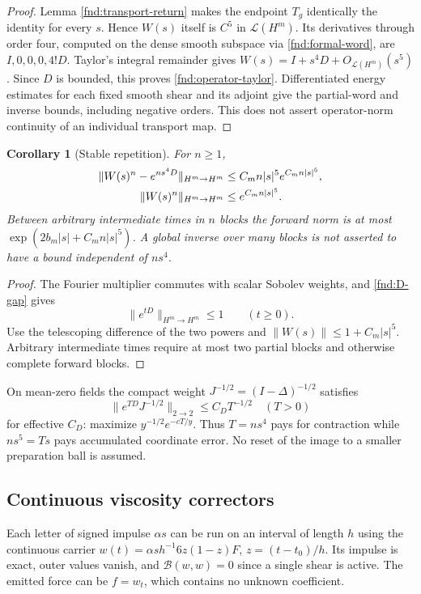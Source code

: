 \documentclass[11pt,a4paper]{amsart}
\newtheorem{corollary}[theorem]{Corollary}
\theoremstyle{definition}
\theoremstyle{remark}
\numberwithin{equation}{section}
\newcommand{\Bcal}{\mathcal B}
\begin{document}
\begin{proof}
Lemma \ref{fnd:transport-return} makes the endpoint $T_g$ identically the
identity for every $s$. Hence $W(s)$ itself is $C^5$ in $\mathcal L(H^m)$.
Its derivatives through order four, computed on the dense smooth subspace via
\eqref{fnd:formal-word}, are $I,0,0,0,4!D$. Taylor's integral remainder gives
$W(s)=I+s^4D+O_{\mathcal L(H^m)}(s^5)$. Since $D$ is bounded, this proves
\eqref{fnd:operator-taylor}. Differentiated energy estimates for each fixed
smooth shear and its adjoint give the partial-word and inverse bounds,
including negative orders. This does not assert operator-norm continuity of
an individual transport map.
\end{proof}

\begin{corollary}[Stable repetition]\label{fnd:repetition}
For $n\ge1$,
\begin{align}
 \|W(s)^n-e^{ns^4D}\|_{H^m\to H^m}
 &\le C_m n|s|^5e^{C_m n|s|^5},\label{fnd:repeat-error}\\
 \|W(s)^n\|_{H^m\to H^m}&\le e^{C_m n|s|^5}.\notag
\end{align}
Between arbitrary intermediate times in $n$ blocks the forward norm is at most
$\exp(2b_m|s|+C_mn|s|^5)$. A global inverse over many blocks is not asserted to
have a bound independent of $ns^4$.
\end{corollary}
\begin{proof}
The Fourier multiplier commutes with scalar Sobolev weights, and
\eqref{fnd:D-gap} gives
\[\|e^{tD}\|_{H^m\to H^m}\le1\qquad(t\ge0).\]
Use the telescoping difference of the two powers and
$\|W(s)\|\le1+C_m|s|^5$. Arbitrary intermediate times require at most two
partial blocks and otherwise complete forward blocks.
\end{proof}

On mean-zero fields the compact weight $J^{-1/2}=(I-\Delta)^{-1/2}$ satisfies
\begin{equation}
 \|e^{TD}J^{-1/2}\|_{2\to2}\le C_DT^{-1/2}\quad(T>0)
 \label{fnd:weighted-decay}
\end{equation}
for effective $C_D$: maximize $y^{-1/2}e^{-cT/y}$. Thus $T=ns^4$ pays for
contraction while $ns^5=Ts$ pays accumulated coordinate error. No reset of
the image to a smaller preparation ball is assumed.

\subsection{Continuous viscosity correctors}

Each letter of signed impulse $\alpha s$ can be run on an interval of length
$h$ using the continuous carrier
$w(t)=\alpha s h^{-1}6z(1-z)F$, $z=(t-t_0)/h$. Its impulse is exact, outer
values vanish, and $\Bcal(w,w)=0$ since a single shear is active. The emitted force
can be $f=w_t$, which contains no unknown coefficient.
\end{document}
